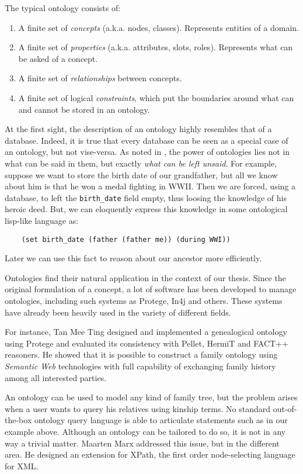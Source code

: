 The typical ontology consists of:
\begin{enumerate}
    \item{A finite set of \textit{concepts} (a.k.a. nodes, classes). Represents entities of a domain.}
    \item{A finite set of \textit{properties} (a.k.a. attributes, slots, roles). Represents what can be asked of a concept.}
    \item{A finite set of \textit{relationships} between concepts.}
    \item{A finite set of logical \textit{constraints}, which put the boundaries around what can and cannot be stored in an
        ontology.}
\end{enumerate}
At the first sight, the description of an ontology highly resembles that of a database. Indeed, it is true that every database can
be seen as a special case of an ontology, but not vise-versa. As noted in \cite{krhyp}, the power of ontologies lies not in what can
be said in them, but exactly \textit{what can be left unsaid}. For example, suppose we want to store the birth date of our
grandfather, but all we know about him is that he won a medal fighting in WWII.
Then we are forced, using a database, to left the \texttt{birth\_date} field empty, thus loosing the knowledge of his heroic deed.
But, we can eloquently express this knowledge in some ontological lisp-like language as:
\begin{verbatim}
    (set birth_date (father (father me)) (during WWI))
\end{verbatim}
Later we can use this fact to reason about our ancestor more efficiently.

Ontologies find their natural application in the context of our thesis.
Since the original formulation of a concept, a lot of software has been developed to manage ontologies, including such systems as
Protege, In4j and others. These systems have already been heavily used in the variety of different fields.

For instance, Tan Mee Ting \cite{tanfamily} designed and
implemented a genealogical ontology using Protege and evaluated its consistency with Pellet, HermiT and FACT++ reasoners. He
showed that it is possible to construct a family ontology using \textit{Semantic Web} \cite{web} technologies with full capability of
exchanging family history among all interested parties.

An ontology can be used to model any kind of family tree, but the problem arises when a user wants to query his relatives using
kinship terms. No standard out-of-the-box ontology query language is able to articulate statements such as in our example above.
Although an ontology can be tailored to do so, it is not in any way a trivial matter. Maarten Marx \cite{xcpath} addressed
this issue, but in the different area. He designed an extension for XPath, the first order node-selecting language for XML.


